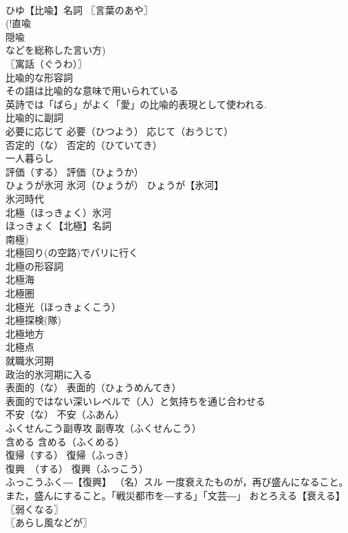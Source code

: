 \documentclass[8pt]{extreport}
\begin{document}
\begin{CJK}{UTF8}{min}
\\	ひゆ【比喩】名詞 〖言葉のあや〗
\\	(!直喩 
\\	隠喩 
\\	などを総称した言い方) 
\\	〖寓話（ぐうわ）〗
\\	比喩的な形容詞 
\\	その語は比喩的な意味で用いられている 
\\	英詩では「ばら」がよく「愛」の比喩的表現として使われる. 
\\	比喩的に副詞 
\\	必要に応じて		必要（ひつよう） 応じて（おうじて） 
\\	否定的（な）		否定的（ひていてき） 
\\	一人暮らし		
\\	評価（する）		評価（ひょうか） 
\\	ひょうが氷河		氷河（ひょうが） ひょうが【氷河】 
\\	氷河時代 
\\	北極（ほっきょく）氷河 
\\	ほっきょく【北極】名詞 
\\	南極) 
\\	北極回り(の空路)でパリに行く 
\\	北極の形容詞 
\\	北極海 
\\	北極圏 
\\	北極光（ほっきょくこう） 
\\	北極探検(隊) 
\\	北極地方 
\\	北極点 
\\	就職氷河期 
\\	政治的氷河期に入る 
\\	表面的（な）		表面的（ひょうめんてき） 
\\	表面的ではない深いレベルで（人）と気持ちを通じ合わせる 
\\	不安（な）		不安（ふあん） 
\\	ふくせんこう副専攻		副専攻（ふくせんこう） 
\\	含める		含める（ふくめる） 
\\	復帰（する）		復帰（ふっき） 
\\	復興　（する）		復興（ふっこう） 
\\	ふっこうふく―【復興】 （名）スル 一度衰えたものが，再び盛んになること。また，盛んにすること。「戦災都市を―する」「文芸―」 おとろえる【衰える】 〖弱くなる〗
\\	〖あらし風などが〗

\end{CJK}
\end{document}
